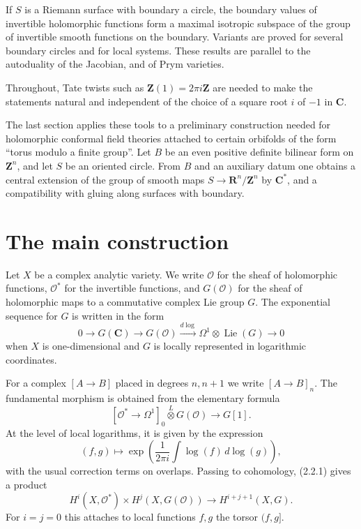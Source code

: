 \documentclass[11pt]{article}
\theoremstyle{remark}
\DeclareMathOperator{\Lie}{Lie}
\newcommand{\C}{\mathbf C}
\newcommand{\Z}{\mathbf Z}
\newcommand{\OO}{\mathcal O}
\begin{document}
If $S$ is a Riemann surface with boundary a circle, the boundary values of invertible holomorphic functions form a maximal isotropic subspace of the group of invertible smooth functions on the boundary. Variants are proved for several boundary circles and for local systems. These results are parallel to the autoduality of the Jacobian, and of Prym varieties.

Throughout, Tate twists such as $\Z(1)=2\pi i\Z$ are needed to make the statements natural and independent of the choice of a square root $i$ of $-1$ in $\C$.

The last section applies these tools to a preliminary construction needed for holomorphic conformal field theories attached to certain orbifolds of the form ``torus modulo a finite group''. Let $B$ be an even positive definite bilinear form on $\Z^n$, and let $S$ be an oriented circle. From $B$ and an auxiliary datum one obtains a central extension of the group of smooth maps $S\to\mathbf R^n/\Z^n$ by $\C^*$, and a compatibility with gluing along surfaces with boundary.

\section{The main construction}

Let $X$ be a complex analytic variety. We write $\OO$ for the sheaf of holomorphic functions, $\OO^*$ for the invertible functions, and $G(\OO)$ for the sheaf of holomorphic maps to a commutative complex Lie group $G$. The exponential sequence for $G$ is written in the form
\begin{equation}\tag{2.1.1}
 0\longrightarrow G(\C)\longrightarrow G(\OO)\xrightarrow{d\log}\Omega^1\otimes\Lie(G)\longrightarrow 0
\end{equation}
when $X$ is one-dimensional and $G$ is locally represented in logarithmic coordinates.

For a complex $[A\to B]$ placed in degrees $n,n+1$ we write $[A\to B]_n$. The fundamental morphism is obtained from the elementary formula
\begin{equation}\tag{2.2.1}
 [\OO^*\to\Omega^1]_0\overset L\otimes G(\OO)
 \longrightarrow G[1].
\end{equation}
At the level of local logarithms, it is given by the expression
\begin{equation}\tag{2.2.2}
 (f,g)\longmapsto \exp\left(\frac{1}{2\pi i}\int \log(f)\,d\log(g)\right),
\end{equation}
with the usual correction terms on overlaps. Passing to cohomology, (2.2.1) gives a product
\begin{equation}\tag{2.3.1}
 H^i(X,\OO^*)\times H^j(X,G(\OO))\longrightarrow H^{i+j+1}(X,G).
\end{equation}
For $i=j=0$ this attaches to local functions $f,g$ the torsor $(f,g]$.
\end{document}
